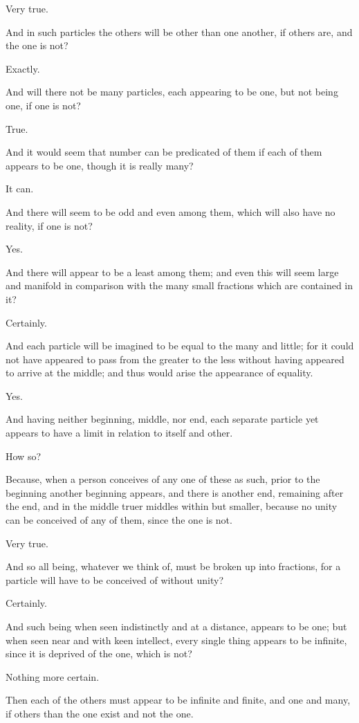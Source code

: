 Very true.

And in such particles the others will be other than one another, if
others are, and the one is not?

Exactly.

And will there not be many particles, each appearing to be one, but not
being one, if one is not?

True.

And it would seem that number can be predicated of them if each of them
appears to be one, though it is really many?

It can.

And there will seem to be odd and even among them, which will also have
no reality, if one is not?

Yes.

And there will appear to be a least among them; and even this will seem
large and manifold in comparison with the many small fractions which are
contained in it?

Certainly.

And each particle will be imagined to be equal to the many and little;
for it could not have appeared to pass from the greater to the less
without having appeared to arrive at the middle; and thus would arise
the appearance of equality.

Yes.

And having neither beginning, middle, nor end, each separate particle
yet appears to have a limit in relation to itself and other.

How so?

Because, when a person conceives of any one of these as such, prior
to the beginning another beginning appears, and there is another end,
remaining after the end, and in the middle truer middles within but
smaller, because no unity can be conceived of any of them, since the one
is not.

Very true.

And so all being, whatever we think of, must be broken up into
fractions, for a particle will have to be conceived of without unity?

Certainly.

And such being when seen indistinctly and at a distance, appears to
be one; but when seen near and with keen intellect, every single thing
appears to be infinite, since it is deprived of the one, which is not?

Nothing more certain.

Then each of the others must appear to be infinite and finite, and one
and many, if others than the one exist and not the one.

